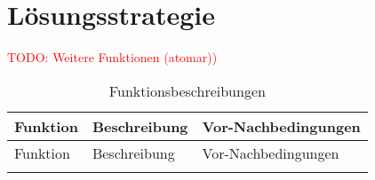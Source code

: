 \chapter{Lösungsstrategie}


\textcolor{red}{TODO: Weitere Funktionen (atomar))}

\begin{longtable}{|>{\raggedright\arraybackslash}p{4cm}|>{\raggedright\arraybackslash}p{5cm}|>{\raggedright\arraybackslash}p{5cm}|}
	\caption{Funktionsbeschreibungen} \label{tab:loesungsstrategie} \\
	\hline
	Funktion & Beschreibung & Vor-Nachbedingungen \\
	\hline
	\endfirsthead
	
	\hline
	Funktion & Beschreibung & Vor-Nachbedingungen \\
	\hline
	\endhead
	
	\hline
	\endfoot
	

\end{longtable}
